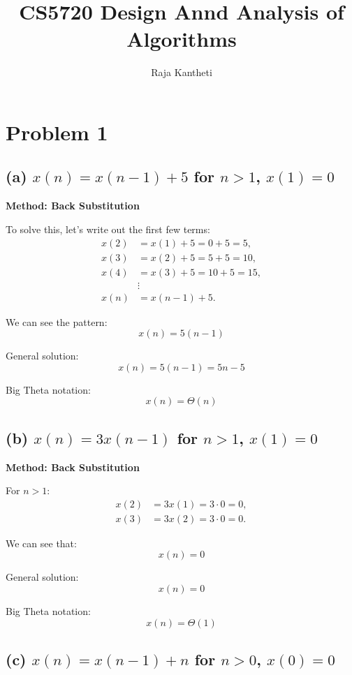 \documentclass{article}
\title{CS5720 Design Annd Analysis of Algorithms}
\author{Raja Kantheti}
\date{}
\begin{document}
\maketitle

\section*{Problem 1}

\subsection*{(a) \( x(n) = x(n-1) + 5 \) for \( n > 1 \), \( x(1) = 0 \)}

\textbf{Method: Back Substitution}

To solve this, let's write out the first few terms:
\begin{align*}
x(2) &= x(1) + 5 = 0 + 5 = 5, \\
x(3) &= x(2) + 5 = 5 + 5 = 10, \\
x(4) &= x(3) + 5 = 10 + 5 = 15, \\
&\vdots \\
x(n) &= x(n-1) + 5.
\end{align*}

We can see the pattern:
\[ x(n) = 5(n-1) \]

General solution:
\[ x(n) = 5(n-1) = 5n - 5 \]

Big Theta notation:
\[ x(n) = \Theta(n) \]

\subsection*{(b) \( x(n) = 3x(n-1) \) for \( n > 1 \), \( x(1) = 0 \)}

\textbf{Method: Back Substitution}

For \( n > 1 \):
\begin{align*}
x(2) &= 3x(1) = 3 \cdot 0 = 0, \\
x(3) &= 3x(2) = 3 \cdot 0 = 0.
\end{align*}

We can see that:
\[ x(n) = 0 \]

General solution:
\[ x(n) = 0 \]

Big Theta notation:
\[ x(n) = \Theta(1) \]

\subsection*{(c) \( x(n) = x(n-1) + n \) for \( n > 0 \), \( x(0) = 0 \)}
\end{document}
